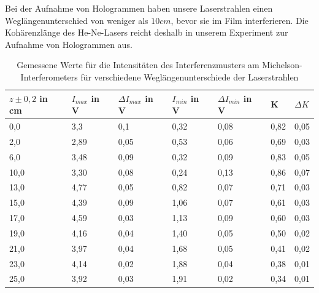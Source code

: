 \documentclass[12pt,a4paper]{article}
\begin{document}
Bei der Aufnahme von Hologrammen haben unsere Laserstrahlen einen Weglängenunterschied von weniger als $10cm$, bevor sie im Film interferieren. Die Kohärenzlänge des He-Ne-Lasers reicht deshalb in unserem Experiment zur Aufnahme von Hologrammen aus.



\begin{table}[h!]
	\centering
	\begin{tabular}{|l|l|l|l|l|l|l|}\hline
		$z \pm 0,2$ in cm & $I_{max}$ in V & $\Delta I_{max}$ in V & $I_{min}$ in V & $\Delta I_{min}$ in V & K & $\Delta K$\\\hline
		0,0 & 3,3	& 0,1	& 0,32	& 0,08	& 0,82&		0,05\\
		2,0&	2,89&	0,05&	0,53&	0,06&	0,69 &	0,03\\
		6,0&	3,48&	0,09&	0,32&	0,09&	0,83&	0,05\\
		10,0&	3,30&	0,08&	0,24&	0,13&	0,86&		0,07\\
		13,0&	4,77&	0,05&	0,82&	0,07&	0,71&	0,03\\
		15,0&	4,39&	0,09&	1,06&	0,07&	0,61&	0,03\\
		17,0&	4,59&	0,03&	1,13&	0,09&	0,60&	0,03\\
		19,0&	4,16&	0,04&	1,40&	0,05&	0,50&	0,02\\
		21,0&	3,97&	0,04&	1,68&	0,05&	0,41&	0,02\\
		23,0&	4,14&	0,02&	1,88&	0,04&	0,38&	0,01\\
		25,0&	3,92&	0,03&	1,91&	0,02&	0,34&	0,01\\
		\hline
	\end{tabular}
	\caption{Gemessene Werte für die Intensitäten des Interferenzmusters am Michelson-Interferometers für verschiedene Weglängenunterschiede der Laserstrahlen}
	\label{ko1}
\end{table}
\end{document}
